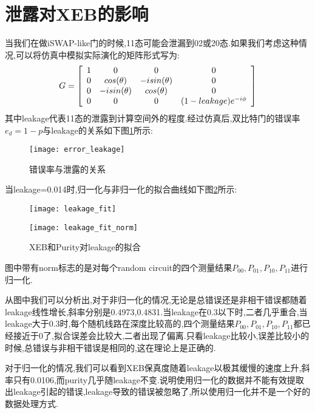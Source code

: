 \section{泄露对XEB的影响}
当我们在做iSWAP-like门的时候,11态可能会泄漏到02或20态.如果我们考虑这种情况,可以将仿真中模拟实际演化的矩阵形式写为:
\begin{equation}
\centering 
G=\left[
\begin{array}{cccc}  
1 & 0 & 0 & 0\\ 
0 & cos(\theta) & -isin(\theta) & 0\\ 
0 & -isin(\theta) & cos(\theta) & 0\\ 
0 & 0 & 0 & (1-leakage)e^{-i\phi}\\ 
\end{array}
\right ]
\end{equation}
其中leakage代表11态的泄露到计算空间外的程度.经过仿真后,双比特门的错误率$e_{d} = 1-p$与leakage的关系如下图\ref{leakage}所示:
\begin{figure}
	\centering
	\texttt{[image: error\_leakage]}
	\caption{错误率与泄露的关系} 
	\label{leakage}
\end{figure}
当leakage=0.014时,归一化与非归一化的拟合曲线如下图\ref{leakage_fit}所示:
\begin{figure}[ht]
	\centering
	\begin{minipage}{0.48\linewidth}
		\texttt{[image: leakage\_fit]}
	\end{minipage}
	\begin{minipage}{0.48\linewidth}
		\texttt{[image: leakage\_fit\_norm]}
	\end{minipage}
	
	\caption{XEB和Purity对leakage的拟合} \label{leakage_fit}
\end{figure}
图中带有norm标志的是对每个random circuit的四个测量结果$P_{00},P_{01},P_{10},P_{11}$进行归一化.

从图中我们可以分析出,对于非归一化的情况,无论是总错误还是非相干错误都随着leakage线性增长,斜率分别是0.4973,0.4831.当leakage在0.3以下时,二者几乎重合,当leakage大于0.3时,每个随机线路在深度比较高的,四个测量结果$P_{00},P_{01},P_{10},P_{11}$都已经接近于0了,拟合误差会比较大,二者出现了偏离.只看leakage比较小,误差比较小的时候,总错误与非相干错误是相同的,这在理论上是正确的.

对于归一化的情况,我们可以看到XEB保真度随着leakage以极其缓慢的速度上升,斜率只有0.0106,而purity几乎随leakage不变.说明使用归一化的数据并不能有效提取出leakage引起的错误,leakage导致的错误被忽略了,所以使用归一化并不是一个好的数据处理方式.




